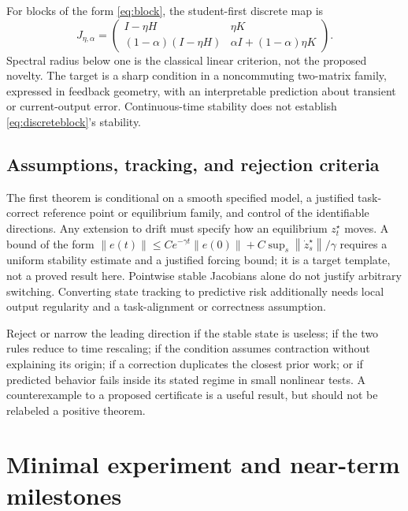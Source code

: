 \documentclass[11pt,a4paper]{article}
\newcommand{\norm}[1]{\left\lVert #1\right\rVert}
\begin{document}
For blocks of the form \eqref{eq:block}, the student-first discrete map is
\begin{equation}
 J_{\eta,\alpha}=\begin{pmatrix}
 I-\eta H&\eta K\\
 (1-\alpha)(I-\eta H)&\alpha I+(1-\alpha)\eta K
 \end{pmatrix}.
 \label{eq:discreteblock}
\end{equation}
Spectral radius below one is the classical linear criterion, not the
proposed novelty. The target is a sharp condition in a noncommuting
two-matrix family, expressed in feedback geometry, with an interpretable
prediction about transient or current-output error. Continuous-time
stability does not establish \eqref{eq:discreteblock}'s stability.

\subsection{Assumptions, tracking, and rejection criteria}
The first theorem is conditional on a smooth specified model, a justified
task-correct reference point or equilibrium family, and control of the
identifiable directions. Any extension to drift must specify how an
equilibrium $z_t^\star$ moves. A bound of the form
$\norm{e(t)}\le C e^{-\gamma t}\norm{e(0)}+
C\sup_s\norm{\dot z_s^\star}/\gamma$
requires a uniform stability estimate and a justified forcing bound;
it is a target template, not a proved result here. Pointwise stable
Jacobians alone do not justify arbitrary switching. Converting state
tracking to predictive risk additionally needs local output regularity
and a task-alignment or correctness assumption.

Reject or narrow the leading direction if the stable state is useless;
if the two rules reduce to time rescaling; if the condition assumes
contraction without explaining its origin; if a correction duplicates
the closest prior work; or if predicted behavior fails inside its stated
regime in small nonlinear tests. A counterexample to a proposed certificate
is a useful result, but should not be relabeled a positive theorem.

\section{Minimal experiment and near-term milestones}
\end{document}

